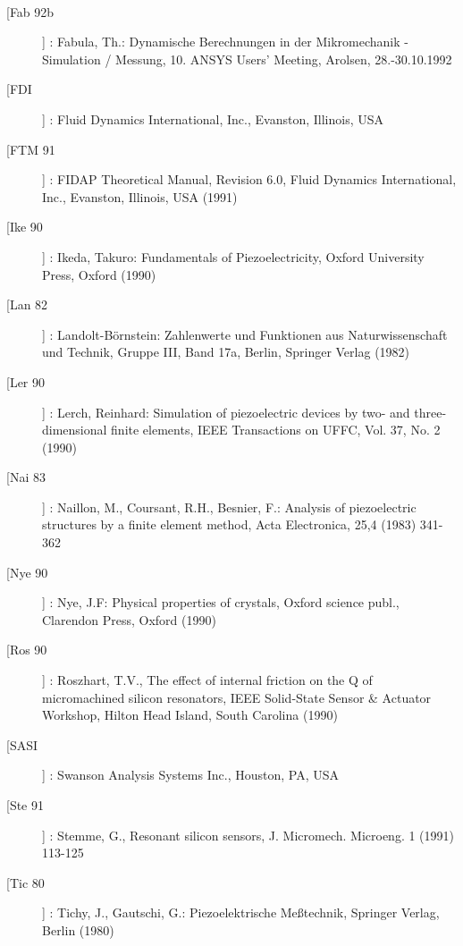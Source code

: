\begin{description}
\\
\item[[Fab 92b]] : Fabula, Th.: Dynamische Berechnungen in der Mikromechanik - Simulation / Messung, 10.  ANSYS Users' Meeting, Arolsen, 28.-30.10.1992
\\
\item[[FDI]] : Fluid Dynamics International, Inc., Evanston, Illinois, USA
\\
\item[[FTM 91]] : FIDAP Theoretical Manual, Revision 6.0, Fluid Dynamics International, Inc., Evanston, Illinois, USA (1991)
\\
\item[[Ike 90]] : Ikeda, Takuro: Fundamentals of Piezoelectricity, Oxford University Press, Oxford (1990)
\\
\item[[Lan 82]] : Landolt-Börnstein: Zahlenwerte und Funktionen aus Naturwissenschaft und Technik, Gruppe III, Band 17a, Berlin, Springer Verlag (1982)
\\
\item[[Ler 90]] : Lerch, Reinhard: Simulation of piezoelectric devices by two- and three-dimensional finite elements, IEEE Transactions on UFFC, Vol. 37, No. 2 (1990)
\\
\item[[Nai 83]] : Naillon, M., Coursant, R.H., Besnier, F.: Analysis of piezoelectric structures by a finite element method, Acta Electronica, 25,4 (1983) 341-362
\\
\item[[Nye 90]] : Nye, J.F: Physical properties of crystals, Oxford science publ., Clarendon Press, Oxford (1990)
\\
\item[[Ros 90]] : Roszhart, T.V., The effect of internal friction on the Q of micromachined silicon resonators, IEEE Solid-State Sensor \& Actuator Workshop, Hilton Head Island, South Carolina (1990)
\\
\item[[SASI]] : Swanson Analysis Systems Inc., Houston, PA, USA
\\
\item[[Ste 91]] : Stemme, G., Resonant silicon sensors, J. Micromech. Microeng. 1 (1991) 113-125
\\
\item[[Tic 80]] : Tichy, J., Gautschi, G.: Piezoelektrische Meßtechnik, Springer Verlag, Berlin (1980)

\end{description}

